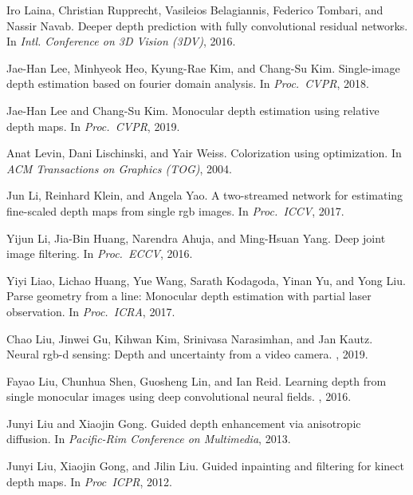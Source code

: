 \documentclass[10pt,twocolumn,letterpaper]{article}
\begin{document}
{\begin{thebibliography}{10}
Iro Laina, Christian Rupprecht, Vasileios Belagiannis, Federico Tombari, and
  Nassir Navab.
\newblock Deeper depth prediction with fully convolutional residual networks.
\newblock In {\em Intl. Conference on 3D Vision (3DV)}, 2016.

Jae-Han Lee, Minhyeok Heo, Kyung-Rae Kim, and Chang-Su Kim.
\newblock Single-image depth estimation based on fourier domain analysis.
\newblock In {\em Proc.~CVPR}, 2018.

Jae-Han Lee and Chang-Su Kim.
\newblock Monocular depth estimation using relative depth maps.
\newblock In {\em Proc.~CVPR}, 2019.

Anat Levin, Dani Lischinski, and Yair Weiss.
\newblock Colorization using optimization.
\newblock In {\em ACM Transactions on Graphics (TOG)}, 2004.

Jun Li, Reinhard Klein, and Angela Yao.
\newblock A two-streamed network for estimating fine-scaled depth maps from
  single rgb images.
\newblock In {\em Proc.~ICCV}, 2017.

Yijun Li, Jia-Bin Huang, Narendra Ahuja, and Ming-Hsuan Yang.
\newblock Deep joint image filtering.
\newblock In {\em Proc.~ECCV}, 2016.

Yiyi Liao, Lichao Huang, Yue Wang, Sarath Kodagoda, Yinan Yu, and Yong Liu.
\newblock Parse geometry from a line: Monocular depth estimation with partial
  laser observation.
\newblock In {\em Proc.~ICRA}, 2017.

Chao Liu, Jinwei Gu, Kihwan Kim, Srinivasa Narasimhan, and Jan Kautz.
\newblock Neural rgb-d sensing: Depth and uncertainty from a video camera.
, 2019.

Fayao Liu, Chunhua Shen, Guosheng Lin, and Ian Reid.
\newblock Learning depth from single monocular images using deep convolutional
  neural fields.
, 2016.

Junyi Liu and Xiaojin Gong.
\newblock Guided depth enhancement via anisotropic diffusion.
\newblock In {\em Pacific-Rim Conference on Multimedia}, 2013.

Junyi Liu, Xiaojin Gong, and Jilin Liu.
\newblock Guided inpainting and filtering for kinect depth maps.
\newblock In {\em Proc~ICPR}, 2012.


\end{thebibliography}}
\end{document}
